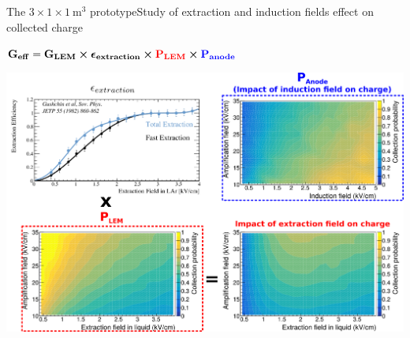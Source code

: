 \documentclass[10pt]{beamer}
\begin{document}
    \begin{frame}{The \texorpdfstring{$3 \times 1 \times \SI{1}{\meter\cubed}$}{311} prototype}{Study of extraction and induction fields effect on collected charge}
    	\begin{scriptsize}
    		\begin{center}
    			$\mathbf{G_{eff}=G_{LEM}\boldsymbol{\times}\boldsymbol{\epsilon}_{extraction} \boldsymbol{\times} \textcolor{red}{P_{LEM}} \boldsymbol{\times} \textcolor{blue}{P_{anode}} }$
    		\end{center}
    		\centering \includegraphics[width=.95\textwidth]{figures/311/effs.png}\\
    	\end{scriptsize} 
    \end{frame}
    
\end{document}
